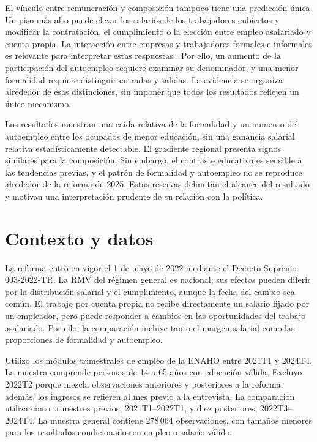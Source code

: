 El vínculo entre remuneración y composición tampoco tiene una predicción única. Un piso más alto puede elevar los salarios de los trabajadores cubiertos y modificar la contratación, el cumplimiento o la elección entre empleo asalariado y cuenta propia. La interacción entre empresas y trabajadores formales e informales es relevante para interpretar estas respuestas \citep{ulyssea_2018}. Por ello, un aumento de la participación del autoempleo requiere examinar su denominador, y una menor formalidad requiere distinguir entradas y salidas. La evidencia se organiza alrededor de esas distinciones, sin imponer que todos los resultados reflejen un único mecanismo.

Los resultados muestran una caída relativa de la formalidad y un aumento del autoempleo entre los ocupados de menor educación, sin una ganancia salarial relativa estadísticamente detectable. El gradiente regional presenta signos similares para la composición. Sin embargo, el contraste educativo es sensible a las tendencias previas, y el patrón de formalidad y autoempleo no se reproduce alrededor de la reforma de 2025. Estas reservas delimitan el alcance del resultado y motivan una interpretación prudente de su relación con la política.

\section{Contexto y datos}

La reforma entró en vigor el 1 de mayo de 2022 mediante el Decreto Supremo 003-2022-TR. La RMV del régimen general es nacional; sus efectos pueden diferir por la distribución salarial y el cumplimiento, aunque la fecha del cambio sea común. El trabajo por cuenta propia no recibe directamente un salario fijado por un empleador, pero puede responder a cambios en las oportunidades del trabajo asalariado. Por ello, la comparación incluye tanto el margen salarial como las proporciones de formalidad y autoempleo.

Utilizo los módulos trimestrales de empleo de la ENAHO entre 2021T1 y 2024T4. La muestra comprende personas de 14 a 65 años con educación válida. Excluyo 2022T2 porque mezcla observaciones anteriores y posteriores a la reforma; además, los ingresos se refieren al mes previo a la entrevista. La comparación utiliza cinco trimestres previos, 2021T1--2022T1, y diez posteriores, 2022T3--2024T4. La muestra general contiene 278\,064 observaciones, con tamaños menores para los resultados condicionados en empleo o salario válido.

